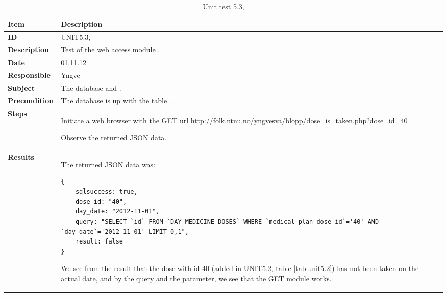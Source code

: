 \begin{table} %
	\begin{center}
		\begin{tabular}{|p{3.0cm}|p{14.0cm}|}
			\hline
			\bf{Item} & \bf{Description}\\
			\hline
			\bf{ID} & UNIT5.3, \\
			\bf{Description} & Test of the web access module \code{dose\_is\_taken.php}.\\
			\bf{Date} & 01.11.12\\
			\bf{Responsible} & Yngve\\
			\bf{Subject} & The database and \code{dose\_is\_taken.php}.\\
			\bf{Precondition} & The database is up with the table \code{DAY\_MEDICINE\_DOSES}.\\
			\bf{Steps} &
			\begin{tabulenum}
				\item Initiate a web browser with the GET url \url{http://folk.ntnu.no/yngvesva/blopp/dose\_is\_taken.php?dose\_id=40}
				\item Observe the returned JSON data.
			\end{tabulenum}\\
			\hline
			\bf{Results} & The returned JSON data was:
\begin{lstlisting}[caption=JSON result from \code{dose\_is\_taken.php}]
{
	sqlsuccess: true,
	dose_id: "40",
	day_date: "2012-11-01",
	query: "SELECT `id` FROM `DAY_MEDICINE_DOSES` WHERE `medical_plan_dose_id`='40' AND `day_date`='2012-11-01' LIMIT 0,1",
	result: false
}
\end{lstlisting}
			We see from the result that the dose with id 40 (added in UNIT5.2, table 
			\ref{tab:unit5.2}) has not been taken on the actual date, and by the query
			and the \code{sqlsuccess} parameter, we see that the GET module works.\\
			\hline
		\end{tabular}
	\end{center}
	\caption{Unit test 5.3, }
	\label{tab:unit5.3}
\end{table}

